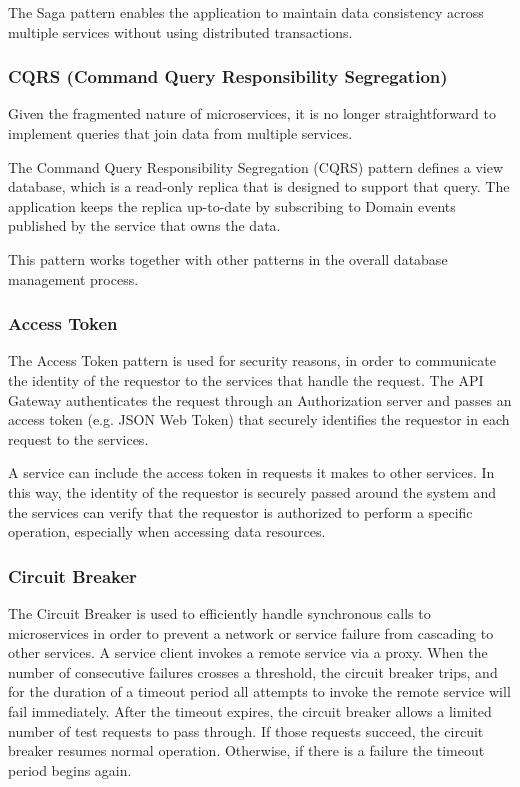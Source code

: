 The Saga pattern enables the application to maintain data consistency across multiple services without using distributed transactions.

\subsubsection{CQRS (Command Query Responsibility Segregation)}
Given the fragmented nature of microservices, it is no longer straightforward to implement queries that join data from multiple services. 

The Command Query Responsibility Segregation (CQRS) pattern defines a view database, which is a read-only replica that is designed to support that query. The application keeps the replica up-to-date by subscribing to Domain events published by the service that owns the data. 

This pattern works together with other patterns in the overall database management process.

\subsubsection{Access Token}
The Access Token pattern is used for security reasons, in order to communicate the identity of the requestor to the services that handle the request. The API Gateway authenticates the request through an Authorization server and passes an access token (e.g. JSON Web Token) that securely identifies the requestor in each request to the services. 

A service can include the access token in requests it makes to other services. In this way, the identity of the requestor is securely passed around the system and the services can verify that the requestor is authorized to perform a specific operation, especially when accessing data resources.

\subsubsection{Circuit Breaker}
The Circuit Breaker is used to efficiently handle synchronous calls to microservices in order to prevent a network or service failure from cascading to other services.
A service client invokes a remote service via a proxy. When the number of consecutive failures crosses a threshold, the circuit breaker trips, and for the duration of a timeout period all attempts to invoke the remote service will fail immediately. After the timeout expires, the circuit breaker allows a limited number of test requests to pass through. If those requests succeed, the circuit breaker resumes normal operation. Otherwise, if there is a failure the timeout period begins again.

